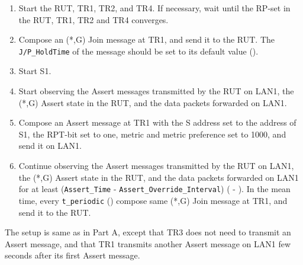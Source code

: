 \documentclass[11pt]{report}
\begin{document}

\begin{enumerate}

  \item Start the RUT, TR1, TR2, and TR4. If necessary, wait until the RP-set
  in the RUT, TR1, TR2 and TR4 converges.

  \item Compose an (*,G) Join message at TR1, and send it to the RUT.
  The \verb=J/P_HoldTime= of the message should be set to its default
  value ({\PimsmJPHoldTime}).

  \item Start S1.

  \item Start observing the Assert messages transmitted by the RUT on
  LAN1, the (*,G) Assert state in the RUT, and the data packets forwarded on
  LAN1.

  \item Compose an Assert message at TR1 with the S address set to the
  address of S1, the RPT-bit set to one, metric and metric preference set to
  1000, and send it on LAN1.

  \item Continue observing the Assert messages transmitted by the RUT on
  LAN1, the (*,G) Assert state in the RUT, and the data packets forwarded on
  LAN1 for at least \newline
  (\verb=Assert_Time= - \verb=Assert_Override_Interval=)
  ({\PimsmAssertTime} - {\PimsmAssertOverrideInterval}).
  In the mean time, every \verb=t_periodic= ({\PimsmTPeriodic}) compose same
  (*,G) Join message at TR1, and send it to the RUT.

\end{enumerate}


The setup is same as in Part A, except that TR3 does not need to transmit an
Assert message, and that TR1 transmits another Assert
message on LAN1 few seconds after its first Assert message.

\end{document}
